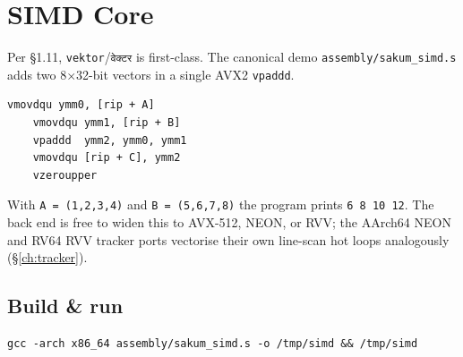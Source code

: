 \section{SIMD Core}\label{ch:simd}

Per \S1.11, \texttt{vektor}/\texttt{वेक्टर} is first-class.  The canonical
demo \texttt{assembly/sakum\_simd.s} adds two 8$\times$32-bit vectors in a
single AVX2 \texttt{vpaddd}.

\begin{lstlisting}[language=SakumAsm,caption={AVX2 vector add (sakum\_simd.s:15).}]
    vmovdqu ymm0, [rip + A]
    vmovdqu ymm1, [rip + B]
    vpaddd  ymm2, ymm0, ymm1
    vmovdqu [rip + C], ymm2
    vzeroupper
\end{lstlisting}

With \texttt{A = (1,2,3,4)} and \texttt{B = (5,6,7,8)} the program prints
\texttt{6 8 10 12}.  The back end is free to widen this to AVX-512, NEON, or
RVV; the AArch64 NEON and RV64 RVV tracker ports vectorise their own
line-scan hot loops analogously (\S\ref{ch:tracker}).

\subsection{Build \& run}

\begin{verbatim}
gcc -arch x86_64 assembly/sakum_simd.s -o /tmp/simd && /tmp/simd
\end{verbatim}
